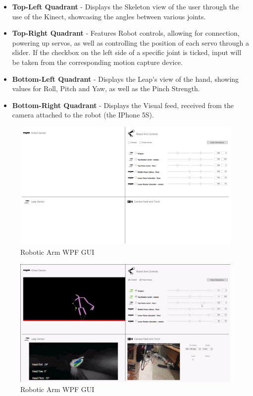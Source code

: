 \documentclass[12p,a4paper]{report}
\begin{document}
\begin{itemize}
\item \textbf{Top-Left Quadrant} - Displays the Skeleton view of the user through the use of the Kinect, showcasing the angles between various joints.
\item \textbf{Top-Right Quadrant} - Features Robot controls, allowing for connection, powering up servos, as well as controlling the position of each servo through a slider. If the checkbox on the left side of a specific joint is ticked, input will be taken from the corresponding motion capture device.
\item \textbf{Bottom-Left Quadrant} - Displays the Leap's view of the hand, showing values for Roll, Pitch and Yaw, as well as the Pinch Strength.
\item \textbf{Bottom-Right Quadrant} - Displays the Visual feed, received from the camera attached to the robot (the IPhone 5S).
\end{itemize}


\begin{figure}[H]
\begin{center}
\includegraphics[scale=0.3]{userinterface}
\caption{Robotic Arm WPF GUI}
\label{fig:userinterface}
\end{center}
\end{figure}


\begin{figure}[H]
\begin{center}
\includegraphics[scale=0.3]{userinterface2}
\caption{Robotic Arm WPF GUI}
\label{fig:userinterface2}
\end{center}
\end{figure}
\end{document}

